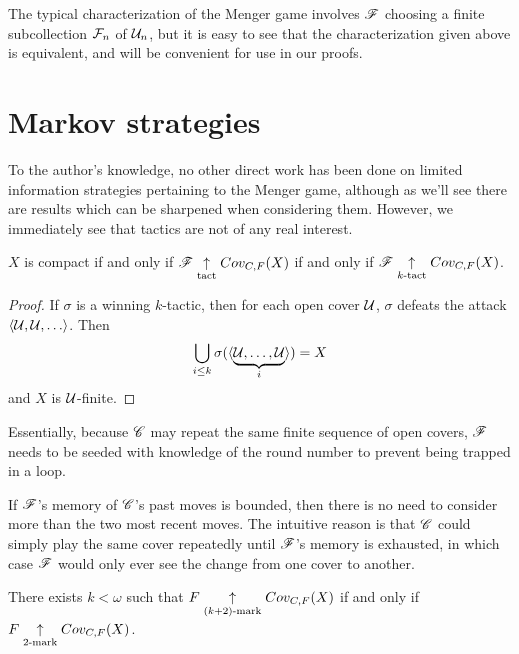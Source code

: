 The typical characterization of the Menger game involves $\mathscr{F}$ choosing
a finite subcollection $\mathcal{F}_n$ of $\mathcal{U}_n$, but it is easy to see that the
characterization given above is equivalent, and will be convenient for use
in our proofs.


\section{Markov strategies}

To the author's knowledge, no other direct work has been done on limited
information strategies pertaining to the Menger game, although as we'll see
there are results which can be sharpened when considering them.
However, we immediately see that tactics are not of any real interest.

\begin{prop}
  $X$ is compact if and only if
  $\mathscr{F} \underset{\text{tact}}{\uparrow} Cov_{C,F}(X)$ if and only if
  $\mathscr{F} \underset{k\text{-tact}}{\uparrow} Cov_{C,F}(X)$.
\end{prop}

\begin{proof}
  If $\sigma$ is a winning $k$-tactic, then for each open cover $\mathcal{U}$,
  $\sigma$ defeats the attack $\<\mc U,\mc U,\dots\>$. Then
  \[
    \bigcup_{i\leq k} \sigma(\langle\underbrace{\mathcal{U},\dots,\mathcal{U}}_i\rangle) = X
  \]
  and $X$ is $\mathcal{U}$-finite.
\end{proof}

Essentially, because $\mathscr{C}$ may repeat the same finite sequence of open covers,
$\mathscr{F}$ needs to be seeded with knowledge of the round number to prevent being
trapped in a loop.

If $\mathscr{F}$'s memory of $\mathscr{C}$'s past moves is bounded, then
there is no need to consider more than the two most recent moves. The
intuitive reason is that $\mathscr{C}$ could simply play the same cover repeatedly
until $\mathscr{F}$'s memory is exhausted, in which case $\mathscr{F}$ would only ever
see the change from one cover to another.

\begin{thm}
  There exists $k<\omega$ such that $F \underset{(k+2)\text{-mark}}{\uparrow} Cov_{C,F}(X)$
  if and only if $F \underset{2\text{-mark}}{\uparrow} Cov_{C,F}(X)$.
\end{thm}

